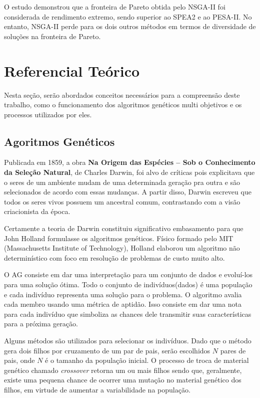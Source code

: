 \documentclass[12pt, %
openright, 
oneside, %
a4paper,    %
brazil]{facom-ufu-abntex2}
\begin{document}
   	O estudo demonstrou que a fronteira de Pareto obtida pelo NSGA-II foi considerada de rendimento extremo, sendo superior ao SPEA2 e ao PESA-II\cite{PESA-II}. No entanto, NSGA-II perde para os dois outros métodos em termos de diversidade de soluções na fronteira de Pareto.
    
\chapter*[Referencial Teórico]{Referencial Teórico}
    
    Nesta seção, serão abordados conceitos necessários para a compreensão deste trabalho, como o funcionamento dos algoritmos genéticos multi objetivos e os processos utilizados por eles.
    
\section{Agoritmos Genéticos} 
	Publicada em 1859, a obra \textbf{Na Origem das Espécies – Sob o Conhecimento da Seleção Natural}, de Charles Darwin, foi alvo de críticas pois explicitava que o seres de um ambiente mudam de uma determinada geração pra outra e são selecionados de acordo com essas mudanças. A partir disso, Darwin escreveu que todos os seres vivos possuem um ancestral comum, contrastando com a visão criacionista da época.
	
	Certamente a teoria de Darwin constituiu significativo embasamento para que John Holland formulasse os algoritmos genéticos. Físico formado pelo MIT (Massachusetts Institute of Technology), Holland elaborou um algoritmo não determinístico com foco em resolução de problemas de custo muito alto.
	
	O AG consiste em dar uma interpretação para um conjunto de dados e evoluí-los para uma solução ótima. Todo o conjunto de indivíduos(dados) é uma população e cada indivíduo representa uma solução para o problema. O algoritmo avalia cada membro usando uma métrica de aptidão. Isso consiste em dar uma nota para cada indivíduo que simboliza as chances dele transmitir suas características para a próxima geração.
	
	Alguns métodos são utilizados para selecionar os indivíduos. Dado que o método gera dois filhos por cruzamento de um par de pais, serão escolhidos $N$ pares de pais, onde $N$ é o tamanho da população inicial. O processo de troca de material genético chamado \textit{crossover} retorna um ou mais filhos sendo que, geralmente, existe uma pequena chance de ocorrer uma mutação no material genético dos filhos, em virtude de aumentar a variabilidade na população.
	
\end{document}
